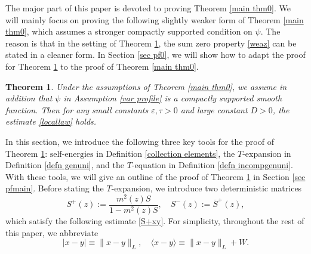 \documentclass{article}
\makeatletter
\newcommand{\1}{\mathds{1}}
\numberwithin{equation}{section}
\newcommand{\be}{\begin{equation}}
\newcommand{\ee}{\end{equation}}
\newcommand{\e}{{\varepsilon}}
\newcommand{\ii}{\mathrm{i}} %
\renewcommand{\geq}{\geqslant}
\renewcommand{\ge}{\geq}
\newcommand{\selfs}{\text{self-energies}}
\DeclareMathOperator{\OO}{O}
\theoremstyle{plain} %
\newtheorem{theorem}{Theorem}[section]
\theoremstyle{remark}
\newcommand{\cor}{\color{red}}
\newcommand{\incomp}{{\text{$T$-equation}}}
\renewcommand{\subsection}{\@startsection
{subsection}%
{2}%
{0mm}%
{-\baselineskip}%
{0.5\baselineskip}%
{\normalfont\bf\itshape}} %
\newcommand{\hty}[1]{{\cor (ht: #1) }}
\makeatother
\begin{document}

The major part of this paper is devoted to proving Theorem \ref{main thm0}. We will mainly focus on proving the following slightly weaker form of Theorem \ref{main thm0}, which assumes a stronger compactly supported condition on $\psi$. The reason is that in the setting of Theorem \ref{main thm}, the sum zero property \eqref{weaz} can be stated in a cleaner form. In Section \ref{sec pf0}, we will show how to adapt the proof for Theorem \ref{main thm} to the proof of Theorem \ref{main thm0}. %

\begin{theorem}\label{main thm}
Under the assumptions of Theorem \ref{main thm0}, we assume in addition that $\psi$ in Assumption \ref{var profile} is a compactly supported smooth function. Then for any small constants $\e,\tau>0$ and large constant $D>0$, the estimate \eqref{locallaw} holds. %
\end{theorem}

In this section, we introduce the following three key tools for the  proof of Theorem \ref{main thm}: $\selfs$ in Definition \ref{collection elements}, the $T$-expansion in Definition \ref{defn genuni}, and the $\incomp$ %
in Definition \ref{defn incompgenuni}. With these tools, we will give an outline of the proof of Theorem \ref{main thm} in Section \ref{sec pfmain}. %
Before stating the $T$-expansion, we introduce two deterministic matrices 
\be\label{Thetapm2}
S^+(z):=\frac{m^2(z) S}{1-m^2(z) S}, \quad S^-(z):=\overline S^+(z),  
\ee
which satisfy the following estimate \eqref{S+xy}. For simplicity, throughout the rest of this paper, we abbreviate
\be\label{Japanesebracket} |x-y|\equiv \|x-y\|_L,\quad \langle x-y \rangle \equiv \|x-y\|_L + W.\ee
\end{document}
